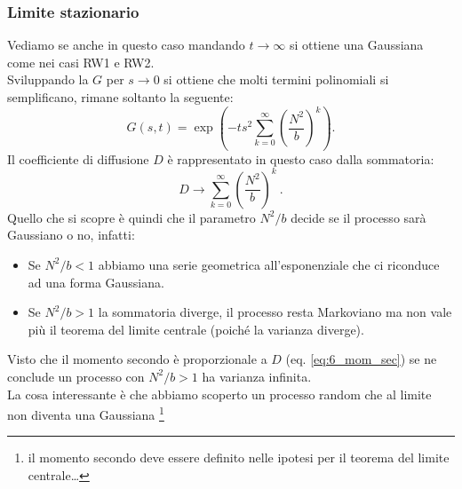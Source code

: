 \subsubsection{Limite stazionario}%
\label{subsub:Limite stazionario}
Vediamo se anche in questo caso mandando $t\to \infty$ si ottiene una Gaussiana come nei casi RW1 e RW2.\\
Sviluppando la $G$ per $s\to 0$ si ottiene che molti termini polinomiali si semplificano, rimane soltanto la seguente:
\[
    G(s,t) = \exp\left(-ts^2 \sum_{k=0}^{\infty} \left(\frac{N^2}{b}\right)^k\right)
.\] 
Il coefficiente di diffusione $D$ è rappresentato in questo caso dalla sommatoria:
\[
    D \to \sum_{k=0}^{\infty} \left(\frac{N^2}{b}\right)^k\
.\] 
Quello che si scopre è quindi che il parametro $N^2 /b$ decide se il processo sarà Gaussiano o no, infatti:
\begin{redbox}{}
\begin{itemize}
    \item Se $N^2 /b< 1$ abbiamo una serie geometrica all'esponenziale che ci riconduce ad una forma Gaussiana.
    \item Se $N^2 /b > 1$ la sommatoria diverge, il processo resta Markoviano ma non vale più il teorema del limite centrale (poiché la varianza diverge).
\end{itemize}
\end{redbox}
\noindent
Visto che il momento secondo è proporzionale a $D$ (eq. \ref{eq:6_mom_sec}) se ne conclude un processo con $N^2 /b > 1$ ha varianza infinita.\\
La cosa interessante è che abbiamo scoperto un processo random che al limite non diventa una Gaussiana \footnote{il momento secondo deve essere definito nelle ipotesi per il teorema del limite centrale\ldots}

